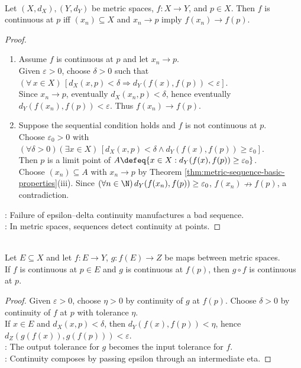 \begin{theorem} \label{thm:metric-continuity-sequential-characterization} \\
Let $(X,d_X),(Y,d_Y)$ be metric spaces, $f:X\to Y$, and $p\in X$. Then $f$ is continuous at $p$ iff $(x_n)\subseteq X$ and $x_n\to p$ imply $f(x_n)\to f(p)$.
\begin{proof}
\begin{enumerate}[label=\roman*.]
\setlength{\itemsep}{0pt}
\item[$(\Rightarrow)$] Assume $f$ is continuous at $p$ and let $x_n\to p$.\\
Given $\varepsilon>0$, choose $\delta>0$ such that $(\forall\,x\in X)\,[d_X(x,p)<\delta\Longrightarrow d_Y(f(x),f(p))<\varepsilon]$.\\
Since $x_n\to p$, eventually $d_X(x_n,p)<\delta$, hence eventually $d_Y(f(x_n),f(p))<\varepsilon$. Thus $f(x_n)\to f(p)$.
\item[$(\Leftarrow)$] Suppose the sequential condition holds and $f$ is not continuous at $p$.\\
Choose $\varepsilon_0>0$ with $(\forall\delta>0)(\exists x\in X)\,[d_X(x,p)<\delta\land d_Y(f(x),f(p))\geq\varepsilon_0]$.\\
Then $p$ is a limit point of $A\defeq\{x\in X:d_Y(f(x),f(p))\geq\varepsilon_0\}$.\\
Choose $(x_n)\subseteq A$ with $x_n\to p$ by Theorem \ref{thm:metric-sequence-basic-properties}(iii). Since $(\forall n\in\N)\,d_Y(f(x_n),f(p))\geq\varepsilon_0$, $f(x_n)\nrightarrow f(p)$, a contradiction.
\end{enumerate}
: Failure of epsilon--delta continuity manufactures a bad sequence.\\
: In metric spaces, sequences detect continuity at points.
\end{proof}
\end{theorem}

\begin{theorem} \label{thm:continuous-composition} \\
Let $E\subseteq X$ and let $f:E\to Y$, $g:f(E)\to Z$ be maps between metric spaces.\\
If $f$ is continuous at $p\in E$ and $g$ is continuous at $f(p)$, then $g\circ f$ is continuous at $p$.
\begin{proof}
Given $\varepsilon>0$, choose $\eta>0$ by continuity of $g$ at $f(p)$. Choose $\delta>0$ by continuity of $f$ at $p$ with tolerance $\eta$.\\
If $x\in E$ and $d_X(x,p)<\delta$, then $d_Y(f(x),f(p))<\eta$, hence $d_Z(g(f(x)),g(f(p)))<\varepsilon$.\\
: The output tolerance for $g$ becomes the input tolerance for $f$.\\
: Continuity composes by passing epsilon through an intermediate eta.
\end{proof}
\end{theorem}

